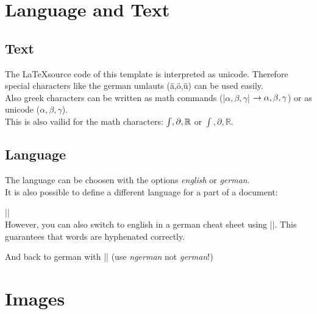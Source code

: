 \documentclass[english]{latex4ei/latex4ei_sheet}
\begin{document}
\section{Language and Text}
\begin{sectionbox}

	\subsection{Text}
		The \LaTeX  source code of this template is interpreted as unicode. Therefore special characters like the german umlauts (ä,ö,ü) can be used easily. \\

		Also greek characters can be written as math commands (\code|$\alpha, \beta, \gamma$| $\rightarrow \alpha, \beta, \gamma$) or as unicode ($α, β, γ$). \\

		This is also vailid for the math characters: $\int, \partial, \operatorname{\mathbb R}$ or $∫, ∂, ℝ$.
	
\end{sectionbox}
\begin{sectionbox}
	\subsection{Language}
		The language can be choosen with the options \emph{english} or \emph{german}. \\

		It is also possible to define a different language for a part of a document:
		
		\code|| \\

		However, you can also switch to english in a german cheat sheet using \code||. This guarantees that words are hyphenated correctly.

		And back to german with \code|| (use \emph{ngerman} not \emph{german}!)
	
\end{sectionbox}

\section{Images}
\end{document}
